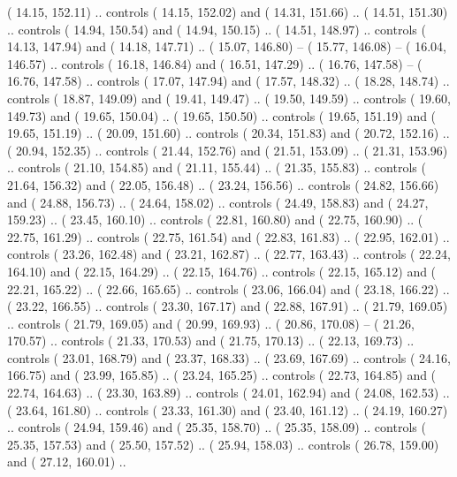{        (  14.15, 152.11) .. controls (  14.15, 152.02) and (  14.31, 151.66) ..
        (  14.51, 151.30) .. controls (  14.94, 150.54) and (  14.94, 150.15) ..
        (  14.51, 148.97) .. controls (  14.13, 147.94) and (  14.18, 147.71) ..
        (  15.07, 146.80) -- 
        (  15.77, 146.08) -- 
        (  16.04, 146.57) .. controls (  16.18, 146.84) and (  16.51, 147.29) ..
        (  16.76, 147.58) -- 
        (  16.76, 147.58) .. controls (  17.07, 147.94) and (  17.57, 148.32) ..
        (  18.28, 148.74) .. controls (  18.87, 149.09) and (  19.41, 149.47) ..
        (  19.50, 149.59) .. controls (  19.60, 149.73) and (  19.65, 150.04) ..
        (  19.65, 150.50) .. controls (  19.65, 151.19) and (  19.65, 151.19) ..
        (  20.09, 151.60) .. controls (  20.34, 151.83) and (  20.72, 152.16) ..
        (  20.94, 152.35) .. controls (  21.44, 152.76) and (  21.51, 153.09) ..
        (  21.31, 153.96) .. controls (  21.10, 154.85) and (  21.11, 155.44) ..
        (  21.35, 155.83) .. controls (  21.64, 156.32) and (  22.05, 156.48) ..
        (  23.24, 156.56) .. controls (  24.82, 156.66) and (  24.88, 156.73) ..
        (  24.64, 158.02) .. controls (  24.49, 158.83) and (  24.27, 159.23) ..
        (  23.45, 160.10) .. controls (  22.81, 160.80) and (  22.75, 160.90) ..
        (  22.75, 161.29) .. controls (  22.75, 161.54) and (  22.83, 161.83) ..
        (  22.95, 162.01) .. controls (  23.26, 162.48) and (  23.21, 162.87) ..
        (  22.77, 163.43) .. controls (  22.24, 164.10) and (  22.15, 164.29) ..
        (  22.15, 164.76) .. controls (  22.15, 165.12) and (  22.21, 165.22) ..
        (  22.66, 165.65) .. controls (  23.06, 166.04) and (  23.18, 166.22) ..
        (  23.22, 166.55) .. controls (  23.30, 167.17) and (  22.88, 167.91) ..
        (  21.79, 169.05) .. controls (  21.79, 169.05) and (  20.99, 169.93) ..
        (  20.86, 170.08) -- 
        (  21.26, 170.57) .. controls (  21.33, 170.53) and (  21.75, 170.13) ..
        (  22.13, 169.73) .. controls (  23.01, 168.79) and (  23.37, 168.33) ..
        (  23.69, 167.69) .. controls (  24.16, 166.75) and (  23.99, 165.85) ..
        (  23.24, 165.25) .. controls (  22.73, 164.85) and (  22.74, 164.63) ..
        (  23.30, 163.89) .. controls (  24.01, 162.94) and (  24.08, 162.53) ..
        (  23.64, 161.80) .. controls (  23.33, 161.30) and (  23.40, 161.12) ..
        (  24.19, 160.27) .. controls (  24.94, 159.46) and (  25.35, 158.70) ..
        (  25.35, 158.09) .. controls (  25.35, 157.53) and (  25.50, 157.52) ..
        (  25.94, 158.03) .. controls (  26.78, 159.00) and (  27.12, 160.01) ..
}
